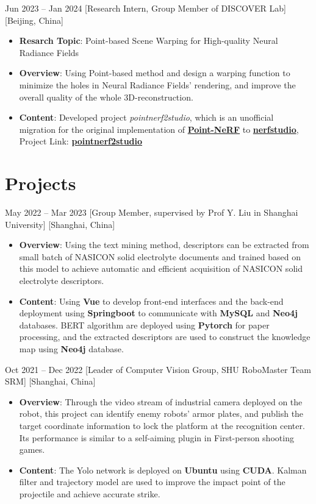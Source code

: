 \documentclass{chicv}
\begin{document}
  {Jun 2023 -- Jan 2024}
  [Research Intern, Group Member of DISCOVER Lab]
  [Beijing, China]
  \begin{itemize}
    \item \textbf{Resarch Topic}: Point-based Scene Warping for High-quality Neural Radiance Fields
    \item \textbf{Overview}: Using Point-based method and design a warping function to minimize the holes in Neural Radiance Fields' rendering, and improve the overall quality of the whole 3D-reconstruction.
    \item \textbf{Content}: Developed project \textit{pointnerf2studio}, which is an unofficial migration for the original implementation of \href{https://github.com/Xharlie/pointnerf/}{\textbf{Point-NeRF}} to \href{https://github.com/nerfstudio-project/nerfstudio/}{\textbf{nerfstudio}}, Project Link: \href{https://github.com/SHUzhekiNg/pointnerf2studio}{\textbf{pointnerf2studio}}
  \end{itemize}
\section{Projects}



  {May 2022 -- Mar 2023}
  [Group Member, supervised by Prof Y. Liu in Shanghai University]
  [Shanghai, China]
  \begin{itemize}
    \item \textbf{Overview}: Using the text mining method, descriptors can be extracted from small batch of NASICON solid electrolyte documents and trained based on this model to achieve automatic and efficient acquisition of NASICON solid electrolyte descriptors.
    \item \textbf{Content}: Using \textbf{Vue} to develop front-end interfaces and the back-end deployment using \textbf{Springboot} to communicate with \textbf{MySQL} and \textbf{Neo4j} databases. BERT algorithm are deployed using \textbf{Pytorch} for paper processing, and the extracted descriptors are used to construct the knowledge map using \textbf{Neo4j} database.
  \end{itemize}

  {Oct 2021 -- Dec 2022}
  [Leader of Computer Vision Group, SHU RoboMaster Team SRM]
  [Shanghai, China]
  \begin{itemize}
    \item \textbf{Overview}: Through the video stream of industrial camera deployed on the robot, this project can identify enemy robots' armor plates, and publish the target coordinate information to lock the platform at the recognition center. Its performance is similar to a self-aiming plugin in First-person shooting games.
    \item \textbf{Content}: The Yolo network is deployed on \textbf{Ubuntu} using \textbf{CUDA}. Kalman filter and trajectory model are used to improve the impact point of the projectile and achieve accurate strike.
  \end{itemize}
\end{document}
